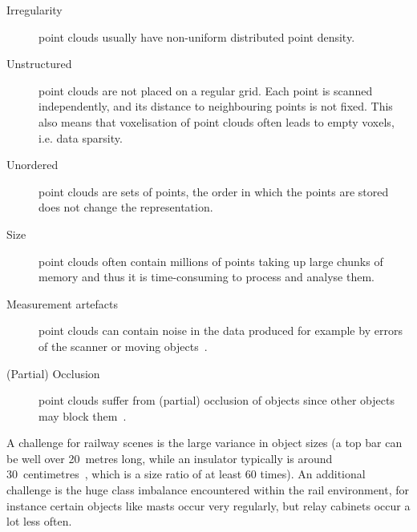 \begin{description}
    \item[Irregularity] point clouds usually have non-uniform distributed point density. 
    \item[Unstructured] point clouds are not placed on a regular grid. Each point is scanned independently, and its distance to neighbouring points is not fixed. This also means that voxelisation of point clouds often leads to empty voxels, i.e. data sparsity.
    \item[Unordered] point clouds are sets of points, the order in which the points are stored does not change the representation. 
    \item[Size] point clouds often contain millions of points taking up large chunks of memory and thus it is time-consuming to process and analyse them.
    \item[Measurement artefacts] point clouds can contain noise in the data produced for example by errors of the scanner or moving objects~\cite{nurunnabi2015outlier}.
    \item[(Partial) Occlusion] point clouds suffer from (partial) occlusion of objects since other objects may block them~\cite{guo2015novel}.
\end{description}

A challenge for railway scenes is the large variance in object sizes (a top bar can be well over 20~metres long, while an insulator typically is around 30~centimetres~\cite{ton2022semantic}, which is a size ratio of at least 60 times). An additional challenge is the huge class imbalance encountered within the rail environment, for instance certain objects like masts occur very regularly, but relay cabinets occur a lot less often.